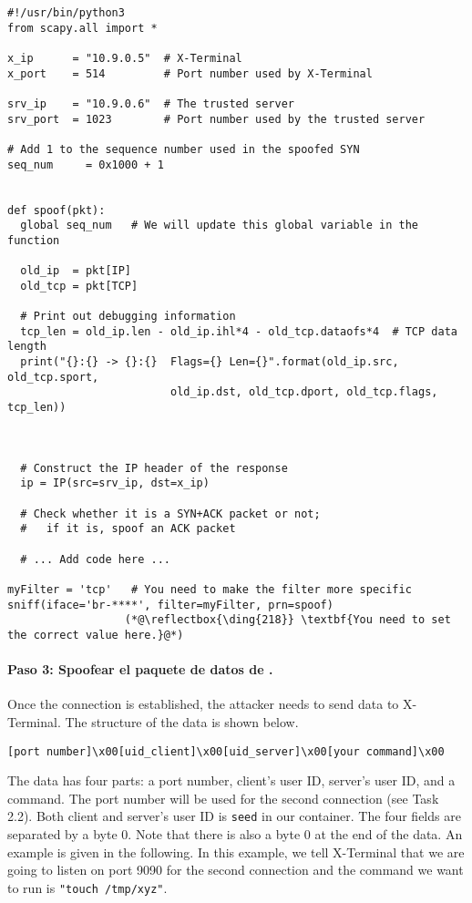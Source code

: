 \begin{lstlisting}
#!/usr/bin/python3
from scapy.all import *

x_ip      = "10.9.0.5"  # X-Terminal
x_port    = 514         # Port number used by X-Terminal

srv_ip    = "10.9.0.6"  # The trusted server
srv_port  = 1023        # Port number used by the trusted server

# Add 1 to the sequence number used in the spoofed SYN
seq_num     = 0x1000 + 1


def spoof(pkt):
  global seq_num   # We will update this global variable in the function

  old_ip  = pkt[IP]
  old_tcp = pkt[TCP]

  # Print out debugging information
  tcp_len = old_ip.len - old_ip.ihl*4 - old_tcp.dataofs*4  # TCP data length
  print("{}:{} -> {}:{}  Flags={} Len={}".format(old_ip.src, old_tcp.sport,
                         old_ip.dst, old_tcp.dport, old_tcp.flags, tcp_len))



  # Construct the IP header of the response
  ip = IP(src=srv_ip, dst=x_ip)

  # Check whether it is a SYN+ACK packet or not;
  #   if it is, spoof an ACK packet

  # ... Add code here ...

myFilter = 'tcp'   # You need to make the filter more specific
sniff(iface='br-****', filter=myFilter, prn=spoof)
                  (*@\reflectbox{\ding{218}} \textbf{You need to set the correct value here.}@*)   
\end{lstlisting}




\paragraph{Paso 3: Spoofear el paquete de datos de \rsh.}
Once the connection is established, the attacker needs to 
send \rsh data to X-Terminal.
The structure of the \rsh data is shown below.

\begin{lstlisting}
[port number]\x00[uid_client]\x00[uid_server]\x00[your command]\x00
\end{lstlisting}

The data has four parts: a port number, client's user ID, server's user ID,
and a command.
The port number will be used for the second connection (see Task 2.2). 
Both client and server's user ID is \texttt{seed} in our container. 
The four fields are separated by a byte 0.
Note that there is also a byte 0 at the end of the \rsh data. An example is given in the
following. In this example, we tell X-Terminal that we are going to listen on port 9090 for the
second connection and the command we want to run is \texttt{"touch /tmp/xyz"}. 

